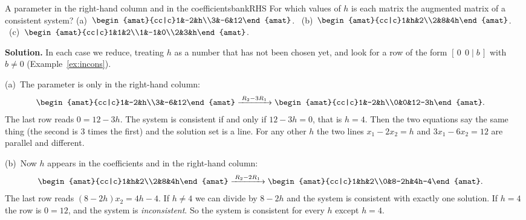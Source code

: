 \documentclass[11pt]{article}
\begin{document}
\begin{exmp}{A parameter in the right-hand column and in the coefficients}{bankRHS}
For which values of $h$ is each matrix the augmented matrix of a consistent system? (a)~$\begin{amat}{cc|c}1&-2&h\\3&-6&12\end{amat}$. \ (b)~$\begin{amat}{cc|c}1&h&2\\2&8&4h\end{amat}$. \ (c)~$\begin{amat}{cc|c}1&1&2\\1&-1&0\\2&3&h\end{amat}$.

\textbf{Solution.} In each case we reduce, treating $h$ as a number that has not been chosen yet, and look for a row of the form $[\,0\ \ 0\mid b\,]$ with $b\neq0$ (Example~\ref{ex:incons}).

(a)~The parameter is only in the right-hand column:
\begin{align*}
&\begin{amat}{cc|c}1&-2&h\\3&-6&12\end{amat}
\rops{R_2-3R_1}
\begin{amat}{cc|c}1&-2&h\\0&0&12-3h\end{amat}.
\end{align*}
The last row reads $0=12-3h$. The system is consistent if and only if $12-3h=0$, that is $h=4$. Then the two equations say the same thing (the second is $3$ times the first) and the solution set is a line. For any other $h$ the two lines $x_1-2x_2=h$ and $3x_1-6x_2=12$ are parallel and different.

(b)~Now $h$ appears in the coefficients and in the right-hand column:
\begin{align*}
&\begin{amat}{cc|c}1&h&2\\2&8&4h\end{amat}
\rops{R_2-2R_1}
\begin{amat}{cc|c}1&h&2\\0&8-2h&4h-4\end{amat}.
\end{align*}
The last row reads $(8-2h)x_2=4h-4$. If $h\neq4$ we can divide by $8-2h$ and the system is consistent with exactly one solution. If $h=4$ the row is $0=12$, and the system is \emph{inconsistent}. So the system is consistent for every $h$ except $h=4$.


\end{exmp}
\end{document}
